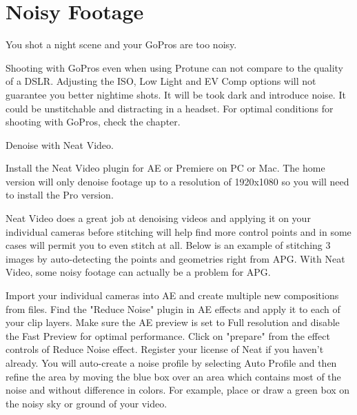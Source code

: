 \chapter{Noisy Footage}
\pagecolor{white}
\label{chap:55}
\begin{fullwidth}

\problem

{\large You shot a night scene and your GoPros are too noisy. \par}

Shooting with GoPros even when using Protune can not compare to the quality of a DSLR. Adjusting the ISO, Low Light and EV Comp options will not guarantee you better nightime shots. It will be took dark and introduce noise. It could be unstitchable and distracting in a headset. For optimal conditions for shooting with GoPros, check the \textbf{} chapter.

\solutions

{\large Denoise with Neat Video. \par}

Install the Neat Video plugin for AE or Premiere on PC or Mac. The home version will only denoise footage up to a resolution of 1920x1080 so you will need to install the Pro version. 

Neat Video does a great job at denoising videos and applying it on your individual cameras before stitching will help find more control points and in some cases will permit you to even stitch at all. Below is an example of stitching 3 images by auto-detecting the points and geometries right from APG. With Neat Video, some noisy footage can actually be a problem for APG.


Import your individual cameras into AE and create multiple new compositions from files. Find the "Reduce Noise" plugin in AE effects and apply it to each of your clip layers. Make sure the AE preview is set to Full resolution and disable the Fast Preview for optimal performance. Click on "prepare" from the effect controls of Reduce Noise effect. Register your license of Neat if you haven't already. You will auto-create a noise profile by selecting Auto Profile and then refine the area by moving the blue box over an area which contains most of the noise and without difference in colors. For example, place or draw a green box on the noisy sky or ground of your video.  



\end{fullwidth}
